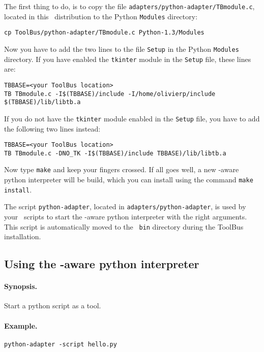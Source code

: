 The first thing to do, is to copy the file 
{\tt adapters/python-adapter/TBmodule.c}, located in this \TB\ distribution
to the Python {\tt Modules} directory:
\begin{verbatim}
cp ToolBus/python-adapter/TBmodule.c Python-1.3/Modules
\end{verbatim}
Now you have to add the two lines to the file {\tt Setup} 
in the Python {\tt Modules} directory.
If you have enabled the {\tt tkinter} module in the {\tt Setup} file,
these lines are:
\begin{verbatim}
TBBASE=<your ToolBus location>
TB TBmodule.c -I$(TBBASE)/include -I/home/olivierp/include $(TBBASE)/lib/libtb.a
\end{verbatim}
If you do not have the {\tt tkinter} module enabled in the {\tt Setup} file,
you have to add the following two lines instead:
\begin{verbatim}
TBBASE=<your ToolBus location>
TB TBmodule.c -DNO_TK -I$(TBBASE)/include TBBASE)/lib/libtb.a
\end{verbatim}
Now type {\tt make} and keep your fingers crossed. If all goes well,
a new \TB -aware python interpreter will be build, which you can install
using the command {\tt make install}.

The script {\tt python-adapter}, located in
{\tt adapters/python-adapter}, is used by your \TB\ scripts to start
the \TB -aware python interpreter with the right arguments. This
script is automatically moved to the \TB\ {\tt bin} directory during
the ToolBus installation.

\subsection{\label{using-python}Using the \TB -aware python interpreter}

\paragraph{Synopsis.} Start a python script as a tool.

\paragraph{Example.} {\tt python-adapter -script hello.py}

